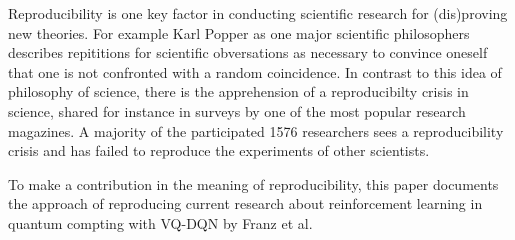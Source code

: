 Reproducibility is one key factor in conducting scientific research for (dis)proving new theories. 
For example Karl Popper as one major scientific philosophers describes repititions for scientific obversations as necessary to convince oneself that one is not confronted with a random coincidence.\autocite{popper} 
In contrast to this idea of philosophy of science, there is the apprehension of a reproducibilty crisis in science, shared for instance in surveys by one of the most popular research magazines. 
A majority of the participated 1576 researchers sees a reproducibility crisis and has failed to reproduce the experiments of other scientists.\autocite{crisis}

To make a contribution in the meaning of reproducibility, this paper documents the approach of reproducing current research about reinforcement learning in quantum compting with \ac{VQ-DQN} by Franz et al.\autocite{instabilities}

